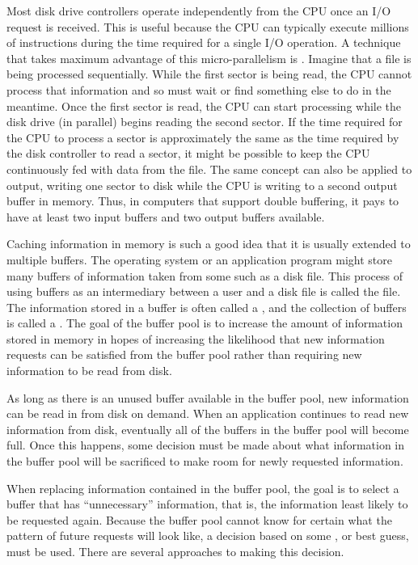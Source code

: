 Most disk drive controllers operate independently
from the CPU once an I/O request is received.
This is useful because the CPU can typically execute millions of
instructions during the time required for a single I/O operation.
A technique that takes maximum advantage of this micro-parallelism is
.
Imagine that a file is being processed sequentially.
While the first sector is being read, the CPU cannot process that
information and so must wait or find something else to do in the
meantime.
Once the first sector is read, the CPU can start processing
while the disk drive (in parallel) begins reading
the second sector.
If the time required for the CPU to process a sector is approximately
the same as the time required by the disk controller to read a sector,
it might be possible to keep the CPU continuously fed with data from
the file.
The same concept can also be applied to output, writing one sector to
disk while the CPU is writing to a second output buffer in memory.
Thus, in computers that support double buffering, it pays to have at
least two input buffers and two output buffers available.

Caching information in memory is such a good idea that
it is usually extended to multiple buffers.
The operating system
or an application program might store many buffers of information
taken from some  such as a disk file.
This process of using buffers as an intermediary between a user and a
disk file is called  the file.
The information stored in a buffer is often called a , and
the collection of buffers is called a .
The goal of the buffer pool is to increase the amount of information
stored in memory in hopes of increasing the likelihood that new
information requests can be satisfied from the buffer pool rather
than requiring new information to be read from disk.

As long as there is an unused buffer available in the buffer pool,
new information can be read in from disk on demand.
When an application continues to read new information from
disk, eventually all of the buffers in the buffer pool will become
full.
Once this happens, some decision must be made about what information
in the buffer pool will be sacrificed to make room for newly
requested information.

When replacing information contained in the buffer pool,
the goal is to select a buffer that has ``unnecessary''
information, that is, the information least likely to be requested
again.
Because the buffer pool cannot know for certain what the pattern of
future requests will look like, a decision based on some
, or best guess, must be used.
There are several approaches to making this decision.


